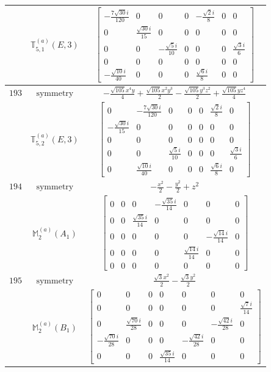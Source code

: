 \documentclass[fleqn,8pt,landscape]{jsarticle}
\begin{document}
\begin{longtable}{ccc}
$  $ & $ \mathbb{T}_{5,1}^{(a)}(E,3) $ & $ \begin{bmatrix} - \frac{7 \sqrt{30} i}{120} & 0 & 0 & 0 & - \frac{\sqrt{2} i}{8} & 0 & 0 \\ 0 & \frac{\sqrt{30} i}{15} & 0 & 0 & 0 & 0 & 0 \\ 0 & 0 & - \frac{\sqrt{5} i}{10} & 0 & 0 & 0 & \frac{\sqrt{3} i}{6} \\ 0 & 0 & 0 & 0 & 0 & 0 & 0 \\ - \frac{\sqrt{10} i}{40} & 0 & 0 & 0 & \frac{\sqrt{6} i}{8} & 0 & 0 \end{bmatrix} $ \\ \hline
$ 193 $ & $ \text{symmetry} $ & $ - \frac{\sqrt{105} x^{4} y}{4} + \frac{\sqrt{105} x^{2} y^{3}}{2} - \frac{\sqrt{105} y^{3} z^{2}}{2} + \frac{\sqrt{105} y z^{4}}{4} $ \\
$  $ & $ \mathbb{T}_{5,2}^{(a)}(E,3) $ & $ \begin{bmatrix} 0 & - \frac{7 \sqrt{30} i}{120} & 0 & 0 & 0 & \frac{\sqrt{2} i}{8} & 0 \\ - \frac{\sqrt{30} i}{15} & 0 & 0 & 0 & 0 & 0 & 0 \\ 0 & 0 & 0 & 0 & 0 & 0 & 0 \\ 0 & 0 & \frac{\sqrt{5} i}{10} & 0 & 0 & 0 & \frac{\sqrt{3} i}{6} \\ 0 & \frac{\sqrt{10} i}{40} & 0 & 0 & 0 & \frac{\sqrt{6} i}{8} & 0 \end{bmatrix} $ \\ \hline
$ 194 $ & $ \text{symmetry} $ & $ - \frac{x^{2}}{2} - \frac{y^{2}}{2} + z^{2} $ \\
$  $ & $ \mathbb{M}_{2}^{(a)}(A_{1}) $ & $ \begin{bmatrix} 0 & 0 & 0 & - \frac{\sqrt{35} i}{14} & 0 & 0 & 0 \\ 0 & 0 & \frac{\sqrt{35} i}{14} & 0 & 0 & 0 & 0 \\ 0 & 0 & 0 & 0 & 0 & - \frac{\sqrt{14} i}{14} & 0 \\ 0 & 0 & 0 & 0 & \frac{\sqrt{14} i}{14} & 0 & 0 \\ 0 & 0 & 0 & 0 & 0 & 0 & 0 \end{bmatrix} $ \\ \hline
$ 195 $ & $ \text{symmetry} $ & $ \frac{\sqrt{3} x^{2}}{2} - \frac{\sqrt{3} y^{2}}{2} $ \\
$  $ & $ \mathbb{M}_{2}^{(a)}(B_{1}) $ & $ \begin{bmatrix} 0 & 0 & 0 & 0 & 0 & 0 & 0 \\ 0 & 0 & 0 & 0 & 0 & 0 & \frac{\sqrt{7} i}{14} \\ 0 & \frac{\sqrt{70} i}{28} & 0 & 0 & 0 & - \frac{\sqrt{42} i}{28} & 0 \\ - \frac{\sqrt{70} i}{28} & 0 & 0 & 0 & - \frac{\sqrt{42} i}{28} & 0 & 0 \\ 0 & 0 & 0 & \frac{\sqrt{35} i}{14} & 0 & 0 & 0 \end{bmatrix} $ \\ \hline

\end{longtable}
\end{document}
